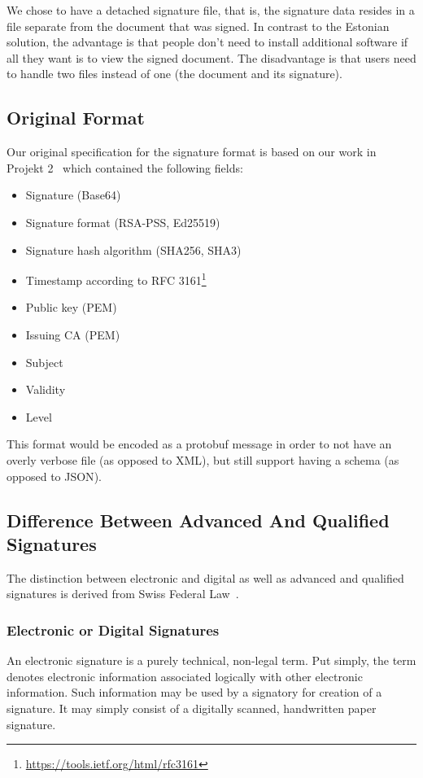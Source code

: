 We chose to have a detached signature file, that is,
the signature data resides in a file separate from the document that was signed.
In contrast to the Estonian solution,
the advantage is that people don't need to install additional software if all they want is to view the signed document.
The disadvantage is that users need to handle two files instead of one (the document and its signature).


\subsection{Original Format}\label{subsec:original-format}
Our original specification for the signature format is based on our work in Projekt 2~\cite{projekt2} which contained the following fields:

\begin{itemize}
    \item Signature (Base64)
    \item Signature format (\gls{RSA-PSS}, \gls{Ed25519})
    \item Signature hash algorithm (\gls{SHA}256, \gls{SHA}3)
    \item Timestamp according to \gls{RFC} 3161\footnote{\url{https://tools.ietf.org/html/rfc3161}}
    \item Public key (\gls{PEM})
    \item Issuing \gls{CA} (\gls{PEM})
    \item Subject
    \item Validity
    \item Level
\end{itemize}

This format would be encoded as a protobuf message in order to not have an overly verbose file (as opposed to \gls{XML}),
but still support having a schema (as opposed to \gls{JSON}).

\subsection{Difference Between Advanced And Qualified Signatures}\label{subsec:difference-between-advanced-and-qualified-signatures}
The distinction between electronic and digital as well as advanced and qualified signatures is derived from Swiss Federal Law~\cite{zertes}.

\subsubsection{Electronic or Digital Signatures}
An electronic signature is a purely technical, non-legal term.
Put simply, the term denotes electronic information associated logically with other electronic information.
Such information may be used by a signatory for creation of a signature.
It may simply consist of a digitally scanned, handwritten paper signature.

